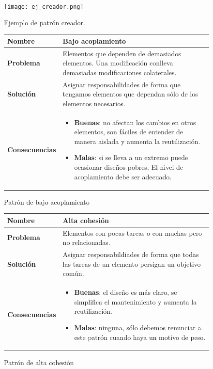 \documentclass[12pt,spanish]{article}
\begin{document}
\begin{figure}[H]
\centering
\texttt{[image: ej\_creador.png]}
\caption{Ejemplo de patrón creador.}
\end{figure}

\begin{figure}[H]
\centering
\begin{tabular}{|m{5cm}|m{8cm}|}
\hline
\textbf{Nombre} & Bajo acoplamiento\\
\hline
\textbf{Problema} & Elementos que dependen de demasiados elementos. Una modificación conlleva demasiadas modificaciones colaterales.\\
\hline
\textbf{Solución} & Asignar responsabilidades de forma que tengamos elementos que dependan sólo de los elementos necesarios.\\
\hline
\textbf{Consecuencias} & 
\begin{itemize}
	\item \textbf{Buenas}: no afectan los cambios en otros elementos, son fáciles de entender de manera aislada y aumenta la reutilización.
	\item \textbf{Malas}: si se lleva a un extremo puede ocasionar diseños pobres. El nivel de acoplamiento debe ser adecuado.
\end{itemize}\\
\hline
\end{tabular}
\caption{Patrón de bajo acoplamiento}
\end{figure}

\begin{figure}[H]
\centering
\begin{tabular}{|m{5cm}|m{8cm}|}
\hline
\textbf{Nombre} & Alta cohesión\\
\hline
\textbf{Problema} & Elementos con pocas tareas o con muchas pero no relacionadas. \\
\hline
\textbf{Solución} & Asignar responsabildiades de forma que todas las tareas de un elemento persigan un objetivo común.\\
\hline
\textbf{Consecuencias} & 
\begin{itemize}
	\item \textbf{Buenas}: el diseño es más claro, se simplifica el mantenimiento y aumenta la reutilización.
	\item \textbf{Malas}: ninguna, sólo debemos renunciar a este patrón cuando haya un motivo de peso. 
\end{itemize}\\
\hline
\end{tabular}
\caption{Patrón de alta cohesión}
\end{figure}
\end{document}
